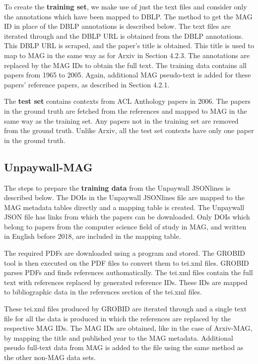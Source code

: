 To create the \textbf{training set}, we make use of just the text files and consider only the annotations which have been mapped to DBLP. The method to get the MAG ID in place of the DBLP annotations is described below. The text files are iterated through and the DBLP URL is obtained from the DBLP annotations. This DBLP URL is scraped, and the paper's title is obtained. This title is used to map to MAG in the same way as for Arxiv in Section 4.2.3. The annotations are replaced by the MAG IDs to obtain the full text. The training data contains all papers from 1965 to 2005.
Again, additional MAG pseudo-text is added for these papers' reference papers, as described in Section 4.2.1.

The \textbf{test set} contains contexts from ACL Anthology papers in 2006. The papers in the ground truth are fetched from the references and mapped to MAG in the same way as the training set. Any papers not in the training set are removed from the ground truth. Unlike Arxiv, all the test set contexts have only one paper in the ground truth. 
\subsection{Unpaywall-MAG}
The steps to prepare the \textbf{training data} from the Unpaywall JSONlines is described below. The DOIs in the Unpaywall JSONlines file are mapped to the MAG metadata tables directly and a mapping table is created. The Unpaywall JSON file has links from which the papers can be downloaded. Only DOIs which belong to papers from the computer science field of study in MAG, and written in English before 2018, are included in the mapping table.

The required PDFs are downloaded using a program and stored. The GROBID \cite{GROBID} tool is then executed on the PDF files to convert them to tei.xml files. GROBID parses PDFs and finds references authomatically. The tei.xml files contain the full text with references replaced by generated reference IDs. These IDs are mapped to bibliographic data in the references section of the tei.xml files. 

These tei.xml files produced by GROBID are iterated through and a single text file for all the data is produced in which the references are replaced by the respective MAG IDs. The MAG IDs are obtained, like in the case of Arxiv-MAG, by mapping the title and published year to the MAG metadata.
Additional pseudo full-text data from MAG is added to the file using the same method as the other non-MAG data sets.

